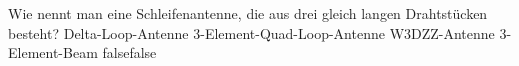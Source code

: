    {Wie nennt man eine Schleifenantenne, die aus drei gleich langen Drahtstücken besteht?}
    {Delta-Loop-Antenne}
    {3-Element-Quad-Loop-Antenne}
    {W3DZZ-Antenne}
    {3-Element-Beam}
    {false}{false}